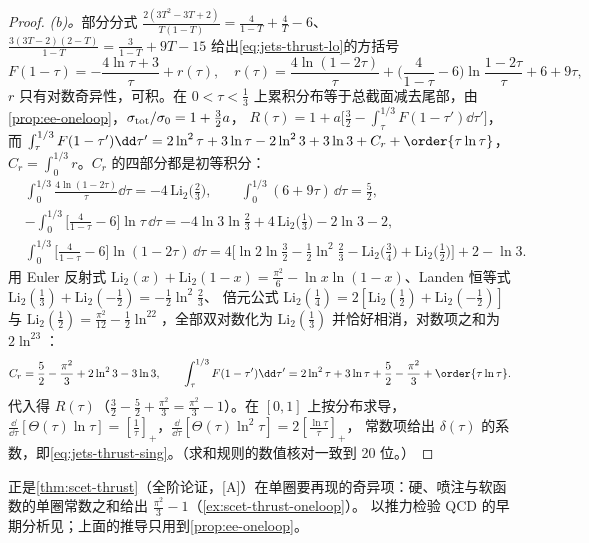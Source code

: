 \begin{proof}
\emph{(b)。}部分分式 $\frac{2(3T^2-3T+2)}{T(1-T)}=\frac{4}{1-T}+\frac4T-6$、$\frac{3(3T-2)(2-T)}{1-T}=\frac{3}{1-T}+9T-15$ 给出\cref{eq:jets-thrust-lo}的方括号
\begin{equation}\label{eq:jets-F-split}
F(1-\tau)=-\frac{4\ln\tau+3}{\tau}+r(\tau),\quad
r(\tau)=\frac{4\ln(1-2\tau)}{\tau}+\Big(\frac{4}{1-\tau}-6\Big)\ln\frac{1-2\tau}{\tau}+6+9\tau ,
\end{equation}
$r$ 只有对数奇异性，可积。在 $0<\tau<\frac13$ 上累积分布等于总截面减去尾部，由\cref{prop:ee-oneloop}，$\sigma_{\rm tot}/\sigma_0=1+\frac32a$，
$R(\tau)=1+a\big[\frac32-\int_\tau^{1/3}F(1-\tau')\dd\tau'\big]$，而
$\int_\tau^{1/3}F(1-\tau')\dd\tau'=2\ln^2\tau+3\ln\tau-2\ln^23+3\ln3+C_r+\order{\tau\ln\tau}$，$C_r=\int_0^{1/3}r$。$C_r$ 的四部分都是初等积分：
\[
\begin{aligned}
&\int_0^{1/3}\frac{4\ln(1-2\tau)}{\tau}\dd\tau=-4\,\mathrm{Li}_2\big(\tfrac23\big),\qquad \int_0^{1/3}(6+9\tau)\,\dd\tau=\tfrac52,\\
&-\int_0^{1/3}\Big[\frac{4}{1-\tau}-6\Big]\ln\tau\,\dd\tau=-4\ln3\ln\tfrac23+4\,\mathrm{Li}_2\big(\tfrac13\big)-2\ln3-2,\\
&\int_0^{1/3}\Big[\frac{4}{1-\tau}-6\Big]\ln(1-2\tau)\,\dd\tau=4\Big[\ln2\ln\tfrac32-\tfrac12\ln^2\tfrac23-\mathrm{Li}_2\big(\tfrac34\big)+\mathrm{Li}_2\big(\tfrac12\big)\Big]+2-\ln3 .
\end{aligned}
\]
用 Euler 反射式 $\mathrm{Li}_2(x)+\mathrm{Li}_2(1-x)=\frac{\pi^2}{6}-\ln x\ln(1-x)$、Landen 恒等式 $\mathrm{Li}_2(\frac13)+\mathrm{Li}_2(-\frac12)=-\frac12\ln^2\frac23$、
倍元公式 $\mathrm{Li}_2(\frac14)=2[\mathrm{Li}_2(\frac12)+\mathrm{Li}_2(-\frac12)]$ 与 $\mathrm{Li}_2(\frac12)=\frac{\pi^2}{12}-\frac12\ln^22$，全部双对数化为 $\mathrm{Li}_2(\frac13)$ 并恰好相消，对数项之和为 $2\ln^23$：
\begin{equation}\label{eq:jets-Cr}
C_r=\frac52-\frac{\pi^2}{3}+2\ln^23-3\ln3 ,\qquad
\int_\tau^{1/3}F(1-\tau')\dd\tau'=2\ln^2\tau+3\ln\tau+\frac52-\frac{\pi^2}{3}+\order{\tau\ln\tau}.
\end{equation}
代入得 $R(\tau)$（$\frac32-\frac52+\frac{\pi^2}{3}=\frac{\pi^2}{3}-1$）。在 $[0,1]$ 上按分布求导，$\frac{\dd}{\dd\tau}[\Theta(\tau)\ln\tau]=[\frac1\tau]_+$，$\frac{\dd}{\dd\tau}[\Theta(\tau)\ln^2\tau]=2[\frac{\ln\tau}{\tau}]_+$，
常数项给出 $\delta(\tau)$ 的系数，即\cref{eq:jets-thrust-sing}。（求和规则的数值核对一致到 20 位。）
\end{proof}

正是\cref{thm:scet-thrust}（全阶论证，[A]）在单圈要再现的奇异项：硬、喷注与软函数的单圈常数之和给出 $\frac{\pi^2}{3}-1$（\cref{ex:scet-thrust-oneloop}）。
以推力检验 QCD 的早期分析见\cite{Farhi1977,DeRujula:1978vmq}；上面的推导只用到\cref{prop:ee-oneloop}。

